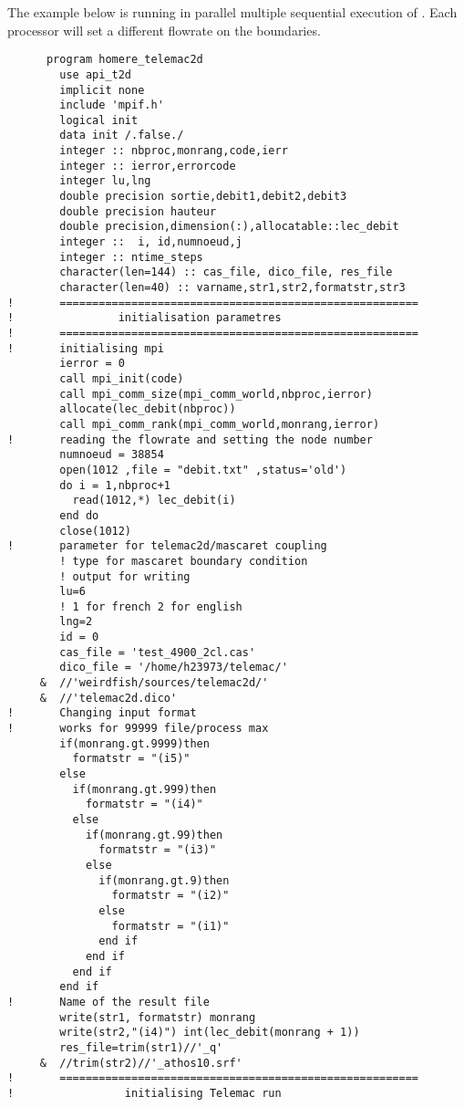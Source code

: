 The example below is running in parallel multiple sequential execution of
. Each processor will set a different flowrate on the boundaries.
\begin{lstlisting}
      program homere_telemac2d
        use api_t2d
        implicit none
        include 'mpif.h'
        logical init
        data init /.false./
        integer :: nbproc,monrang,code,ierr 
        integer :: ierror,errorcode
        integer lu,lng
        double precision sortie,debit1,debit2,debit3
        double precision hauteur
        double precision,dimension(:),allocatable::lec_debit
        integer ::  i, id,numnoeud,j
        integer :: ntime_steps
        character(len=144) :: cas_file, dico_file, res_file
        character(len=40) :: varname,str1,str2,formatstr,str3
!       =======================================================
!                initialisation parametres
!       =======================================================
!       initialising mpi
        ierror = 0
        call mpi_init(code)
        call mpi_comm_size(mpi_comm_world,nbproc,ierror)
        allocate(lec_debit(nbproc))
        call mpi_comm_rank(mpi_comm_world,monrang,ierror)
!       reading the flowrate and setting the node number
        numnoeud = 38854
        open(1012 ,file = "debit.txt" ,status='old')      
        do i = 1,nbproc+1
          read(1012,*) lec_debit(i)
        end do
        close(1012)
!       parameter for telemac2d/mascaret coupling
        ! type for mascaret boundary condition      
        ! output for writing
        lu=6
        ! 1 for french 2 for english
        lng=2
        id = 0
        cas_file = 'test_4900_2cl.cas'
        dico_file = '/home/h23973/telemac/'
     &  //'weirdfish/sources/telemac2d/'
     &  //'telemac2d.dico'
!       Changing input format
!       works for 99999 file/process max
        if(monrang.gt.9999)then
          formatstr = "(i5)"
        else
          if(monrang.gt.999)then
            formatstr = "(i4)"
          else
            if(monrang.gt.99)then
              formatstr = "(i3)"
            else
              if(monrang.gt.9)then
                formatstr = "(i2)"
              else
                formatstr = "(i1)"
              end if
            end if
          end if
        end if
!       Name of the result file
        write(str1, formatstr) monrang
        write(str2,"(i4)") int(lec_debit(monrang + 1))
        res_file=trim(str1)//'_q'
     &  //trim(str2)//'_athos10.srf'
!       =======================================================
!                 initialising Telemac run

\end{lstlisting}
